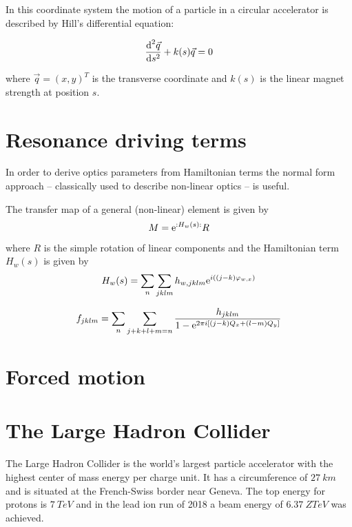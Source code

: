 In this coordinate system the motion of a particle in a circular accelerator is described by Hill's
differential equation:

\begin{equation}
    \frac{\text{d}^2 \vec{q}}{\text{d} s^2} + k(s)\vec{q} = 0
    \label{eq_hills}
\end{equation}

where $\vec{q} = (x,y)^T$ is the transverse coordinate and $k(s)$ is the linear magnet strength at
position $s$.





\section{Resonance driving terms}

In order to derive optics parameters from Hamiltonian terms the normal form approach -- classically
used to describe non-linear optics -- is useful. 

The transfer map of a general (non-linear) element is given by
\begin{equation}
    M= \text{e}^{:H_w(s):}R
\end{equation}
where $R$ is the simple rotation of linear components and the Hamiltonian term $H_w(s)$ is given by
\begin{equation}
    H_w(s) = \sum\limits_n\sum\limits_{jklm} h_{w,jklm}\text{e}^{i\left((j-k)\varphi_{w,x}\right)}
\end{equation}

\begin{equation}
    f_{jklm}=\sum\limits_{n}\sum\limits_{j+k+l+m=n} \frac{h_{jklm} }{1-\text{e}^{2\pi i [(j-k)Q_x+(l-m)Q_y]}}
\end{equation}


\section{Forced motion}

\section{The Large Hadron Collider}

The Large Hadron Collider is the world's largest particle accelerator with the highest center of mass
energy per charge unit. It has a circumference of $\SI{27}{km}$ and is situated at the French-Swiss 
border near Geneva. The top energy for protons is $\SI{7}{TeV}$
and in the lead ion run of 2018 a beam energy of $\SI{6.37}{Z TeV}$ was achieved.

